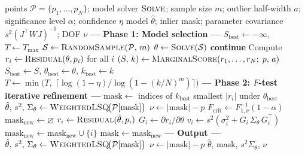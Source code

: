 \documentclass[11pt]{article}
\begin{document}
\begin{algorithm}[ht]
\caption{RANSAC with marginal likelihood scoring and $F$-test refinement}
\label{alg:ransac}
\begin{algorithmic}[1]
\Require points $\mathcal{P} = \{p_1, \ldots, p_N\}$; model solver
  $\textsc{Solve}$; sample size $m$; outlier half-width $a$;
  significance level $\alpha$; confidence $\eta$
\Ensure model $\hat\theta$; inlier mask; parameter covariance
  $s^2(J^\top\!W J)^{-1}$; DOF $\nu$
\Statex
\Statex \textbf{--- Phase 1: Model selection ---}
\State $S_{\mathrm{best}} \gets -\infty$, \quad $T \gets T_{\max}$
  \State $\mathcal{S} \gets \textsc{RandomSample}(\mathcal{P},\, m)$
  \State $\theta \gets \textsc{Solve}(\mathcal{S})$
  \If{$\theta = \varnothing$} \textbf{continue}
  \EndIf
  \State Compute $r_i \gets \textsc{Residual}(\theta, p_i)$ for all $i$
  \State $(S,\, k) \gets \textsc{MarginalScore}(r_1, \ldots, r_N;\; p,\, a)$
    \State $S_{\mathrm{best}} \gets S$, \quad
      $\theta_{\mathrm{best}} \gets \theta$, \quad
      $k_{\mathrm{best}} \gets k$
    \State $T \gets \min\!\bigl(T,\;
      \lceil\log(1 - \eta) / \log(1 - (k/N)^m)\rceil\bigr)$
  \EndIf
\EndFor
\Statex
\Statex \textbf{--- Phase 2: $F$-test iterative refinement ---}
\State $\mathrm{mask} \gets$ indices of $k_{\mathrm{best}}$ smallest $|r_i|$
  under $\theta_{\mathrm{best}}$
\Repeat
  \State $\hat\theta,\, s^2,\, \Sigma_\theta \gets
    \textsc{WeightedLSQ}\!\bigl(\mathcal{P}[\mathrm{mask}]\bigr)$
  \State $\nu \gets |\mathrm{mask}| - p$
  \State $F_{\mathrm{crit}} \gets F_{1,\nu}^{-1}(1 - \alpha)$
  \State $\mathrm{mask}_{\mathrm{new}} \gets \varnothing$
    \State $r_i \gets \textsc{Residual}(\hat\theta, p_i)$
    \State $G_i \gets \partial r_i / \partial \theta$
    \State $v_i \gets s^2\!\left(\sigma_i^2
      + G_i\, \Sigma_\theta\, G_i^\top\right)$
      \State $\mathrm{mask}_{\mathrm{new}} \gets
        \mathrm{mask}_{\mathrm{new}} \cup \{i\}$
    \EndIf
  \EndFor
  \State $\mathrm{mask} \gets \mathrm{mask}_{\mathrm{new}}$
\Statex
\Statex \textbf{--- Output ---}
\State $\hat\theta,\, s^2,\, \Sigma_\theta \gets
  \textsc{WeightedLSQ}\!\bigl(\mathcal{P}[\mathrm{mask}]\bigr)$
\State $\nu \gets |\mathrm{mask}| - p$
\State \Return $\hat\theta$, mask, $s^2 \Sigma_\theta$, $\nu$
\end{algorithmic}
\end{algorithm}
\end{document}
